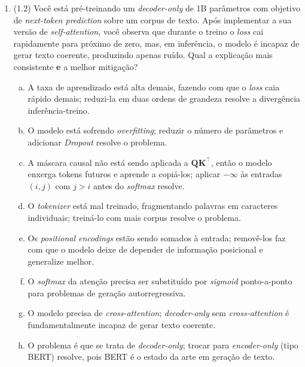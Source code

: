 \documentclass[11pt,a4paper]{article}
\begin{document}
\begin{enumerate}[1)]
\item (1.2) Você está pré-treinando um \textit{decoder-only} de 1B parâmetros com objetivo de \textit{next-token prediction} sobre um corpus de texto. Após implementar a sua versão de \textit{self-attention}, você observa que durante o treino o \textit{loss} cai rapidamente para próximo de zero, mas, em inferência, o modelo é incapaz de gerar texto coerente, produzindo apenas ruído. Qual a explicação mais consistente \textbf{e} a melhor mitigação?
\begin{enumerate}[a)]
    \item A taxa de aprendizado está alta demais, fazendo com que o \textit{loss} caia rápido demais; reduzi-la em duas ordens de grandeza resolve a divergência inferência-treino.
    \item O modelo está sofrendo \textit{overfitting}; reduzir o número de parâmetros e adicionar \textit{Dropout} resolve o problema.
    \item A máscara causal não está sendo aplicada a $\mathbf{Q}\mathbf{K}^\top$, então o modelo enxerga tokens futuros e aprende a copiá-los; aplicar $-\infty$ às entradas $(i, j)$ com $j > i$ antes do \textit{softmax} resolve.
    \item O \textit{tokenizer} está mal treinado, fragmentando palavras em caracteres individuais; treiná-lo com mais corpus resolve o problema.
    \item Os \textit{positional encodings} estão sendo somados à entrada; removê-los faz com que o modelo deixe de depender de informação posicional e generalize melhor.
    \item O \textit{softmax} da atenção precisa ser substituído por \textit{sigmoid} ponto-a-ponto para problemas de geração autorregressiva.
    \item O modelo precisa de \textit{cross-attention}; \textit{decoder-only} sem \textit{cross-attention} é fundamentalmente incapaz de gerar texto coerente.
    \item O problema é que se trata de \textit{decoder-only}; trocar para \textit{encoder-only} (tipo BERT) resolve, pois BERT é o estado da arte em geração de texto.
\end{enumerate}


\end{enumerate}
\end{document}
